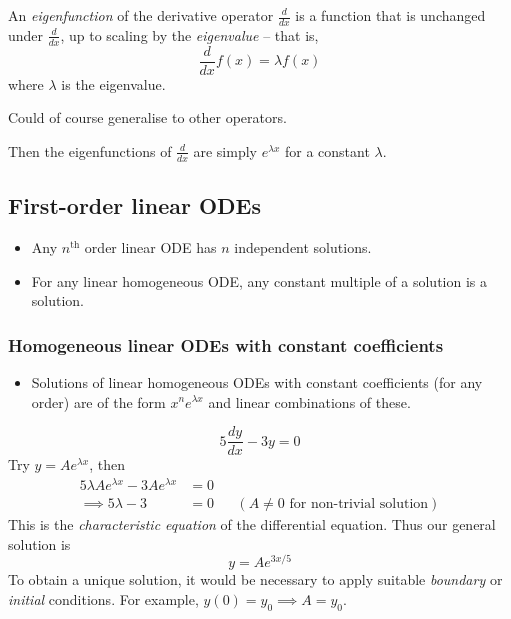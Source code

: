 \documentclass{../../template/note}
\begin{document}
    \begin{definition}[Eigenfunctions]
        An \emph{eigenfunction} of the derivative operator \(\frac{d}{dx}\) is a function that is unchanged under \(\frac{d}{dx}\), up to scaling by the \emph{eigenvalue} -- that is,
        \[
            \frac{d}{dx} f(x) = \lambda f(x)
        \]
        where \(\lambda\) is the eigenvalue.
    \end{definition}

    \begin{remark*}
        Could of course generalise to other operators.
    \end{remark*}
    
    
    Then the eigenfunctions of \(\frac{d}{dx}\) are simply \(e^{\lambda x}\) for a constant \(\lambda\).
    
    \subsection{First-order linear ODEs}

    \begin{itemize}
        \item Any \(n^\text{th}\) order linear ODE has \(n\) independent solutions.
        \item For any linear homogeneous ODE, any constant multiple of a solution is a solution.
    \end{itemize}
    
    \subsubsection{Homogeneous linear ODEs with constant coefficients}

    \begin{itemize}
        \item Solutions of linear homogeneous ODEs with constant coefficients (for any order) are of the form \(x^ne^{\lambda x}\) and linear combinations of these.
    \end{itemize}
    
    \begin{example}
        \[
            5 \frac{dy}{dx} - 3y = 0
        \]
        Try \(y = Ae^{\lambda x}\), then
        \begin{align*}
            5 \lambda Ae^{\lambda x} - 3A e^{\lambda x} &= 0 \\
            \implies 5 \lambda - 3 &= 0 && (A \neq 0 \text{ for non-trivial solution})
        \end{align*}
        This is the \emph{characteristic equation} of the differential equation. Thus our general solution is
        \[
            y = Ae^{3x/5}
        \]
        To obtain a unique solution, it would be necessary to apply suitable \emph{boundary} or \emph{initial} conditions. For example, \(y(0) = y_0 \implies A = y_0\).
    \end{example}
    
\end{document}
